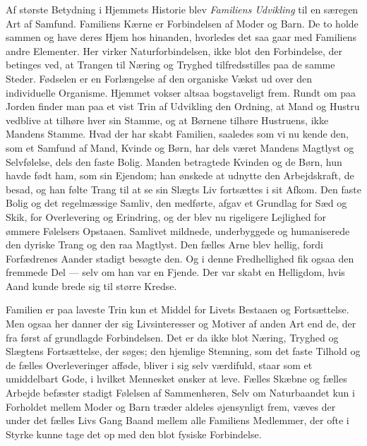\documentclass[12pt,a4paper]{article}
\newcommand{\opage}[1]{\marginnote{\footnotesize\textit{[#1]}}}
\begin{document}
Af største Betydning i Hjemmets Historie blev \emph{Familiens Udvikling} til en
særegen Art af Samfund. Familiens Kærne er Forbindelsen af Moder og Barn. De
to holde sammen og have deres Hjem hos hinanden, hvorledes det saa gaar med
Familiens andre Elementer. Her virker Naturforbindelsen, ikke blot den
Forbindelse, der betinges ved, at Trangen til Næring og Tryghed
tilfredsstilles paa de samme Steder. Fødselen er en Forlængelse af den
organiske Vækst ud over den individuelle Organisme. Hjemmet vokser altsaa
bogstaveligt frem. Rundt om paa Jorden finder man paa et vist Trin af
Udvikling den Ordning, at Mand og Hustru vedblive at tilhøre hver sin Stamme,
og at Børnene tilhøre Hustruens, ikke Mandens Stamme. Hvad der har skabt
Familien, saaledes som vi nu kende den, som et Samfund af Mand, Kvinde og
Børn, har dels været Mandens Magtlyst og Selvfølelse, dels den faste Bolig.
Manden betragtede Kvinden og de Børn, hun havde født ham, som sin Ejendom; han
ønskede at udnytte den Arbejdskraft, de besad, og han følte Trang til at se
sin Slægts Liv fortsættes i sit Afkom. Den faste Bolig og det regelmæssige
Samliv, den medførte, afgav et Grundlag for Sæd og Skik, for Overlevering og
Erindring, og der blev nu rigeligere Lejlighed for ømmere Følelsers Opstaaen.
Samlivet mildnede, underbyggede og humaniserede den dyriske Trang og den raa
Magtlyst. Den fælles Arne blev hellig, fordi Forfædrenes Aander stadigt
besøgte den. Og i denne Fredhellighed fik ogsaa den fremmede Del --- selv om
han var en Fjende. Der var skabt en Helligdom, hvis
Aand kunde brede sig til større Kredse.

Familien er paa laveste Trin kun et Middel for Livets Bestaaen og
Fortsættelse. Men ogsaa her danner der sig Livsinteresser og Motiver af anden
Art end de, der fra først af grundlagde Forbindelsen. Det er da ikke blot
Næring, Tryghed og Slægtens Fortsættelse, der søges; den hjemlige Stemning,
som det faste Tilhold og de fælles Overleveringer afføde, bliver i sig selv
værdifuld, staar som et umiddelbart Gode, i hvilket Mennesket ønsker at leve.
Fælles Skæbne og fælles Arbejde befæster stadigt Følelsen af Sammenhøren, Selv %
om Naturbaandet kun i Forholdet mellem Moder og Barn træder aldeles
øjensynligt frem, væves der under det fælles Livs Gang Baand mellem
\opage{6}alle
Familiens Medlemmer, der ofte i Styrke kunne tage det op med den blot fysiske
Forbindelse.
\end{document}
